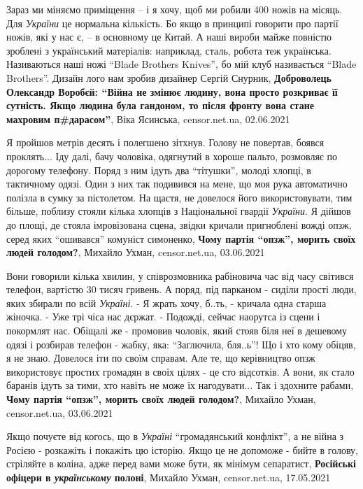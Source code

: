 Зараз ми міняємо приміщення – і я хочу, щоб ми робили 400 ножів на місяць. Для
\emph{України} це нормальна кількість. Бо якщо в принципі говорити про партії
ножів, які у нас є, – в основному це Китай. А наші вироби майже повністю
зроблені з український матеріалів: наприклад, сталь, робота теж українська.
Називаються наші ножі \enquote{Blade Brothers Knives}, бо мій клуб називається
\enquote{Blade Brothers}.  Дизайн лого нам зробив дизайнер Сергій Снурник,
\textbf{Доброволець Олександр Воробєй: \enquote{Війна не змінює людину, вона
просто розкриває її сутність. Якщо людина була гандоном, то після фронту вона
стане махровим п\#дарасом}},
Віка Ясинська, censor.net.ua, 02.06.2021

Я пройшов метрів десять і полегшено зітхнув. Голову не повертав, боявся проклять...
Іду далі, бачу чоловіка, одягнутий в хороше пальто, розмовляє по дорогому
телефону. Поряд з ним ідуть два \enquote{тітушки}, молоді хлопці, в тактичному одязі.
Один з них так подивився на мене, що моя рука автоматично полізла в сумку за
пістолетом. На щастя, не довелося його використовувати, тим більше, поблизу
стояли кілька хлопців з Національної гвардії \emph{України}.  Я дійшов до площі, де
стояла імровізована сцена, звідки кричали пригноблені вожді опзж, серед яких
\enquote{ошивався} комуніст симоненко,
\textbf{Чому партія \enquote{опзж}, морить своїх людей голодом?}, 
Михайло Ухман, censor.net.ua, 03.06.2021

Вони говорили кілька хвилин, у співрозмовника рабіновича час від часу світився телефон, вартістю 30 тисяч гривень.
А поряд, під парканом - сиділи прості люди, яких збирали по всій \emph{Україні}.
- Я жрать хочу, б..ть, - кричала одна старша жіночка. - Уже трі чіса нас дєржат.
- Подожді, сейчас наорутса із сцени і покормлят нас. Обіщалі же - промовив
чоловік, який стояв біля неї в дешевому одязі і розбирав телефон - жабку, яка:
\enquote{Заглючила, бля..ь}!
Що і хто кому обіцяв, я не знаю. Довелося іти по своїм справам. Але те, що
керівництво опзж використовує простих громадян в своїх цілях - це сто
відсотків. А вони, як стало баранів ідуть за тими, хто навіть не може їх
нагодувати...
Так і здохните рабами,
\textbf{Чому партія \enquote{опзж}, морить своїх людей голодом?}, 
Михайло Ухман, censor.net.ua, 03.06.2021

Якщо почуєте від когось, що в \emph{Україні} \enquote{громадянський конфлікт},
а не війна з Росією - розкажіть і покажіть цю історію. Якщо це не допоможе -
бийте в голову, стріляйте в коліна, адже перед вами може бути, як мінімум
сепаратист,
\textbf{Російські офіцери в \emph{українському} полоні},
Михайло Ухман, censor.net.ua, 17.05.2021

